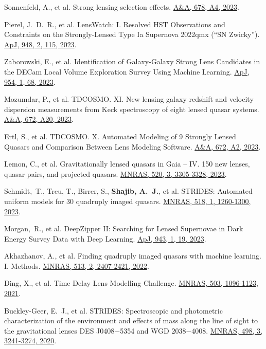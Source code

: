 \documentclass[margin, line]{res}
\begin{document}
\begin{resume}
\begin{etaremune}
	\item Sonnenfeld, A., et al. Strong lensing selection effects. \href{https://ui.adsabs.harvard.edu/abs/2023A\%26A...678A...4S/abstract}{A\&A, 678, A4, 2023}.
	\item Pierel, J.~D.~R., et al. LensWatch: I. Resolved HST Observations and Constraints on the Strongly-Lensed Type Ia Supernova 2022qmx (``SN Zwicky'').  \href{https://ui.adsabs.harvard.edu/abs/2023ApJ...948..115P/abstract}{ApJ, 948, 2, 115, 2023}.
	\item Zaborowski, E., et al. Identification of Galaxy-Galaxy Strong Lens Candidates in the DECam Local Volume Exploration Survey Using Machine Learning. \href{https://ui.adsabs.harvard.edu/abs/2023ApJ...954...68Z/abstract}{ApJ, 954, 1, 68, 2023}.
	\item Mozumdar, P., et al. TDCOSMO. XI. New lensing galaxy redshift and velocity dispersion measurements from Keck spectroscopy of eight lensed quasar systems. \href{https://ui.adsabs.harvard.edu/abs/2023A\%26A...672A..20M/abstract}{A\&A, 672,  A20, 2023}.
	\item Ertl, S., et al. TDCOSMO. X. Automated Modeling of 9 Strongly Lensed Quasars and Comparison Between Lens Modeling Software. \href{https://ui.adsabs.harvard.edu/abs/2023A\%26A...672A...2E/abstract}{A\&A, 672, A2, 2023}.
	\item Lemon, C., et al. Gravitationally lensed quasars in Gaia -- IV. 150 new lenses, quasar pairs, and projected quasars. \href{https://ui.adsabs.harvard.edu/abs/2023MNRAS.520.3305L/abstract}{MNRAS, 520, 3, 3305-3328, 2023}.
	\item Schmidt,~T., Treu, T., Birrer, S., \textbf{Shajib, A.~J.}, et al. STRIDES: Automated uniform models for 30 quadruply imaged quasars. \href{https://ui.adsabs.harvard.edu/abs/2023MNRAS.518.1260S/abstract}{MNRAS, 518, 1, 1260-1300, 2023}.
	\item Morgan,~R., et al. DeepZipper II: Searching for Lensed Supernovae in Dark Energy Survey Data with Deep Learning. \href{https://ui.adsabs.harvard.edu/abs/2023ApJ...943...19M/abstract}{ApJ, 943, 1, 19, 2023}.
	\item Akhazhanov, A., et al. Finding quadruply imaged quasars with machine learning. I. Methods. \href{https://ui.adsabs.harvard.edu/abs/2022MNRAS.513.2407A/abstract}{MNRAS, 513, 2, 2407-2421, 2022}.
	\item Ding, X., et al. Time Delay Lens Modelling Challenge. \href{https://ui.adsabs.harvard.edu/abs/2021MNRAS.503.1096D/abstract}{MNRAS, 503, 1096-1123, 2021}.
	\item Buckley-Geer, E.~J., et al. STRIDES: Spectroscopic and photometric characterization of the environment and effects of mass along the line of sight to the gravitational lenses DES J0408$-$5354 and WGD 2038$-$4008. \href{https://ui.adsabs.harvard.edu/abs/2020MNRAS.498.3241B/abstract}{MNRAS, 498, 3, 3241-3274, 2020}.

\end{etaremune}
\end{resume}
\end{document}
